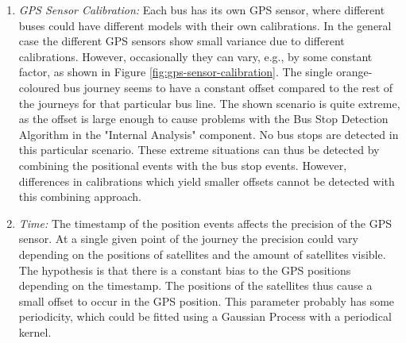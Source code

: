 \begin{enumerate}
    \item \textit{GPS Sensor Calibration:}
    Each bus has its own GPS sensor, where different buses could have different models with their own calibrations.
    In the general case the different GPS sensors show small variance due to different calibrations.
    However, occasionally they can vary, e.g., by some constant factor, as shown in Figure \ref{fig:gps-sensor-calibration}.
    The single orange-coloured bus journey seems to have a constant offset compared to the rest of the journeys for that particular bus line.
    The shown scenario is quite extreme, as the offset is large enough to cause problems with the Bus Stop Detection Algorithm in the "Internal Analysis" component.
    No bus stops are detected in this particular scenario.
    These extreme situations can thus be detected by combining the positional events with the bus stop events.
    However, differences in calibrations which yield smaller offsets cannot be detected with this combining approach.


    \item \textit{Time:}
    The timestamp of the position events affects the precision of the GPS sensor.
    At a single given point of the journey the precision could vary depending on the positions of satellites and the amount of satellites visible.
    The hypothesis is that there is a constant bias to the GPS positions depending on the timestamp.
    The positions of the satellites thus cause a small offset to occur in the GPS position.
    This parameter probably has some periodicity, which could be fitted using a Gaussian Process with a periodical kernel.
    
\end{enumerate} 


